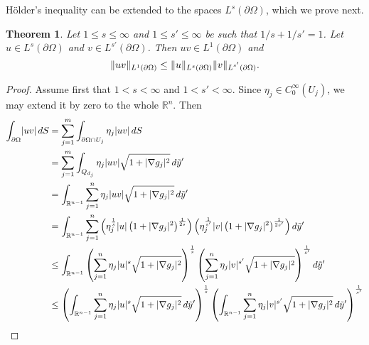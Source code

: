 \documentclass[english, 12pt, a4paper, sci, utf8, a-2b, online]{aaltothesis}
\theoremstyle{definition}
\theoremstyle{plain}
\newtheorem{theorem}{Theorem}[section]
\DeclarePairedDelimiter\abs{\lvert}{\rvert}
\DeclarePairedDelimiter\norm{\lVert}{\rVert}
\newcommand*\diff{\mathop{}\!d}
\numberwithin{equation}{section}
\begin{document}
Hölder's inequality can be extended to the spaces $L^s(\partial \Omega)$,
which we prove next.
\begin{theorem}
    \label{thm:boundaryhöldersineq}
    Let $1 \leq s \leq \infty$ and $1 \leq s' \leq \infty$ be
    such that $1/s + 1/s' = 1$.
    Let $u \in L^s(\partial \Omega)$ and $v \in L^{s'}(\partial \Omega)$.
    Then $uv \in L^1(\partial \Omega)$ and
    \begin{equation*}
        \norm{uv}_{L^1(\partial \Omega)} \leq \norm{u}_{L^s(\partial \Omega)}
            \norm{v}_{\vphantom{L^s(\partial \Omega)} \smash{L^{s'}(\partial \Omega)}}.
    \end{equation*}
\end{theorem}
\begin{proof}
    Assume first that $1 < s < \infty$ and $1 < s' < \infty$.
    Since $\eta_j \in C_0^{\infty}(U_j)$, we may extend it by zero to the whole
    $\mathbb{R}^n$. Then 
    \begin{align*}
        \int_{\partial \Omega} \abs{uv} \diff S
        &= \sum_{j=1}^{m} \int_{\partial \Omega \cap U_j} \eta_j \abs{uv} \diff S \\
        &= \sum_{j=1}^{m} \int_{Q_{d_j}} \eta_j \abs{uv}
            \sqrt{1 + \abs{\nabla g_j}^2} \diff \tilde{y}' \\
        &= \int_{\mathbb{R}^{n-1}} \sum_{j=1}^{n} \eta_j \abs{uv}
            \sqrt{1 + \abs{\nabla g_j}^2} \diff \tilde{y}' \\
        &= \int_{\mathbb{R}^{n-1}} \sum_{j=1}^{n}
            \left( \eta_j^{\frac{1}{s}} \abs{u}
                \left( 1 + \abs{\nabla g_j}^2 \right)^{\frac{1}{2s}} \right)
            \left( \eta_j^{\frac{1}{s'}} \abs{v}
                \left( 1 + \abs{\nabla g_j}^2 \right)^{\frac{1}{2s'}} \right)
            \diff \tilde{y}' \\
        &\leq \int_{\mathbb{R}^{n-1}}
            \left( \sum_{j=1}^{n} \eta_j \abs{u}^s \sqrt{1 + \abs{\nabla g_j}^2} 
                \right)^{\frac{1}{s}}
            \left( \sum_{j=1}^{n} \eta_j \abs{v}^{s'} \sqrt{1 + \abs{\nabla g_j}^2}
                \right)^{\frac{1}{s'}}
            \diff \tilde{y}' \\
        &\leq \left( \int_{\mathbb{R}^{n-1}} \sum_{j=1}^{n} \eta_j \abs{u}^s
                \sqrt{1 + \abs{\nabla g_j}^2}
                    \diff \tilde{y}' \right)^{\frac{1}{s}}
            \left( \int_{\mathbb{R}^{n-1}} \sum_{j=1}^{n} \eta_j \abs{v}^{s'}
                \sqrt{1 + \abs{\nabla g_j}^2}
                    \diff \tilde{y}' \right)^{\frac{1}{s'}} \\

\end{align*}
\end{proof}
\end{document}
